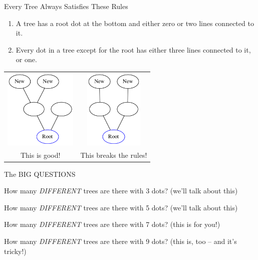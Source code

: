 \documentclass{beamer}
\begin{document}
\begin{frame}
\begin{center}
\Large Every Tree Always Satisfies These Rules
\end{center}
\begin{enumerate}
\item  A tree has a root dot at the bottom and either zero or two lines connected to it. 
\item Every dot in a tree except for the root has either three lines connected to it, or one.
\end{enumerate}
\begin{center}
\begin{tabular}{cc}
    \includegraphics[height=1.5in]{G2.png} &  \includegraphics[height=1.5in]{G4.png} \\
    This is good! & This  breaks the rules!
\end{tabular}
 \end{center}
\end{frame}
\begin{frame}
    \begin{center}
    {\Large The BIG QUESTIONS}
    
    \bigskip\noindent
    {\Large How many \textit{DIFFERENT} trees are there with 3 dots?}
        (we'll talk about this)

    \bigskip\noindent
    {\Large How many \textit{DIFFERENT} trees are there with 5 dots?}
        (we'll talk about this)

    \bigskip\noindent
    {\Large How many \textit{DIFFERENT} trees are there with 7 dots?}
        (this is for you!)
        
    \bigskip\noindent
    {\Large How many \textit{DIFFERENT} trees are there with 9 dots?}
        (this is, too -- and it's tricky!)
    \end{center}

\end{frame}
\end{document}
